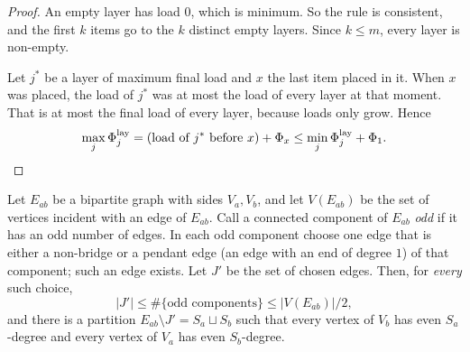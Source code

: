 \begin{proof}
An empty layer has load $0$, which is minimum. So the rule is consistent, and the first $k$ items go to the $k$ distinct empty layers. Since $k\le m$, every layer is non-empty.

Let $j^*$ be a layer of maximum final load and $x$ the last item placed in it. When $x$ was placed, the load of $j^*$ was at most the load of every layer at that moment. That is at most the final load of every layer, because loads only grow. Hence
\[
\max_j\Phi^{\mathrm{lay}}_j=(\text{load of }j^*\text{ before }x)+\Phi_x\le\min_j\Phi^{\mathrm{lay}}_j+\Phi_1.
\qedhere
\]
\end{proof}

\begin{lemma}\label{s6:lemPAR}
Let $E_{ab}$ be a bipartite graph with sides $V_a,V_b$, and let $V(E_{ab})$ be the set of vertices incident with an edge of $E_{ab}$. Call a connected component of $E_{ab}$ \emph{odd} if it has an odd number of edges. In each odd component choose one edge that is either a non-bridge or a pendant edge (an edge with an end of degree $1$) of that component; such an edge exists. Let $J'$ be the set of chosen edges. Then, for \emph{every} such choice,
\[
|J'|\le\#\{\text{odd components}\}\le|V(E_{ab})|/2,
\]
and there is a partition $E_{ab}\setminus J'=S_a\sqcup S_b$ such that every vertex of $V_b$ has even $S_a$-degree and every vertex of $V_a$ has even $S_b$-degree.
\deps{\ref{s1:citEuler}}
\end{lemma}

